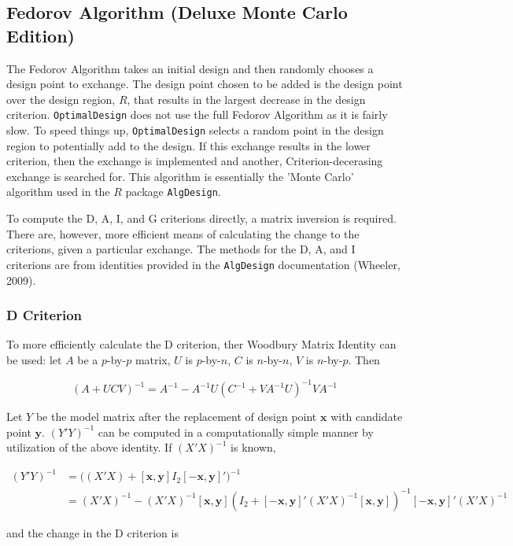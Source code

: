 \documentclass{article}\usepackage[]{graphicx}\usepackage[]{color}
\begin{document}
\subsection{Fedorov Algorithm (Deluxe Monte Carlo Edition)}
The Fedorov Algorithm takes an initial design and then randomly chooses a design point to exchange. The design point chosen to be added is the design point over the design region, $R$, that results in the largest decrease in the design criterion. \texttt{OptimalDesign} does not use the full Fedorov Algorithm as it is fairly slow. To speed things up, \texttt{OptimalDesign} selects a random point in the design region to potentially add to the design. If this exchange results in the lower criterion, then the exchange is implemented and another, Criterion-decerasing exchange is searched for. This algorithm is essentially the 'Monte Carlo' algorithm used in the $R$ package \texttt{AlgDesign}.

To compute the D, A, I, and G criterions directly, a matrix inversion is required. There are, however, more efficient means of calculating the change to the criterions, given a particular exchange. The methods for the D, A, and I criterions are from identities provided in the \texttt{AlgDesign} documentation (Wheeler, 2009).

\subsubsection{D Criterion}
To more efficiently calculate the D criterion, ther Woodbury Matrix Identity can be used: let $A$ be a $p$-by-$p$ matrix, $U$ is $p$-by-$n$, $C$ is $n$-by-$n$, $V$ is $n$-by-$p$. Then

$$ (A + UCV)^{-1} = A^{-1} - A^{-1}U(C^{-1} + VA^{-1}U)^{-1}VA^{-1} $$

Let $Y$ be the model matrix after the replacement of design point $\textbf{x}$ with candidate point $\textbf{y}$. $(Y'Y)^{-1}$ can be computed in a computationally simple manner by utilization of the above identity. If $(X'X)^{-1}$ is known,

\begin{align*}
  (Y'Y)^{-1} &= \big( (X'X) + [\textbf{x},\textbf{y}] I_2 [-\textbf{x},\textbf{y}]' \big)^{-1} \\
  &= (X'X)^{-1} - (X'X)^{-1}[\textbf{x}, \textbf{y}] (I_2 + [-\textbf{x},\textbf{y}]' (X'X)^{-1} [\textbf{x},\textbf{y}] )^{-1} [-\textbf{x},\textbf{y}]' (X'X)^{-1} 
\end{align*}

and the change in the D criterion is
  
\end{document}
